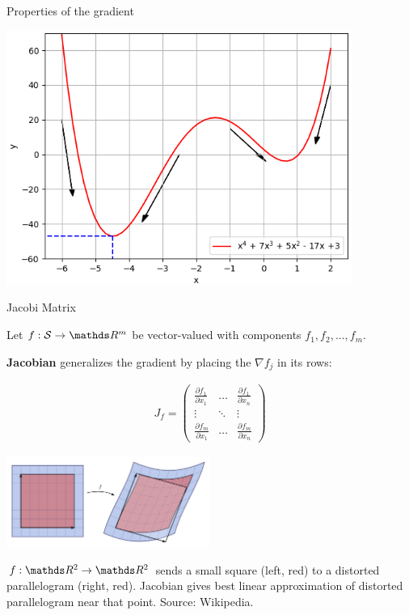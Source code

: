 \begin{vbframe}{Properties of the gradient}
\begin{center}
\includegraphics[width=0.85\textwidth]{figure_man/negative_gradients.png}\\
\end{center}



\end{vbframe}




\begin{vbframe}{Jacobi Matrix}

Let $f: \mathcal{S} \to \R^m$ be vector-valued with components $f_1, f_2, ..., f_m$. 

\textbf{Jacobian} generalizes the gradient by placing the $\nabla f_j$ in its rows:

\begin{eqnarray*}
	J_f = \begin{pmatrix} \frac{\partial f_1}{\partial x_1} & \hdots & \frac{\partial f_1}{\partial x_n} \\
	\vdots & \ddots & \vdots \\
	\frac{\partial f_m}{\partial x_1} & \hdots & \frac{\partial f_m}{\partial x_n}
	\end{pmatrix}
\end{eqnarray*}

\begin{center}
	\includegraphics[width = 0.5\textwidth]{figure_man/Jacobian.png} \\
	\begin{footnotesize}
	$f: \R^2 \to \R^2$ sends  a small square (left, red) to a distorted parallelogram (right, red). Jacobian gives best linear approximation of distorted parallelogram near that point. Source: Wikipedia.
	\end{footnotesize}
\end{center}


\end{vbframe}

\endlecture
